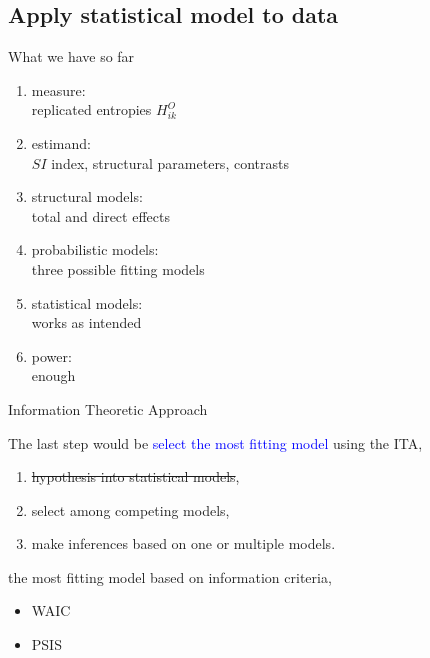 \subsection{Apply statistical model to data}
%
%
\begin{frame}[t, negative]
	\subsectionpage
\end{frame}
%
%
\begin{lhframe}[rhgraphic={\texttt{[image: lab\_to\_research.png]}}]
	{What we have so far}
	
	\begin{enumerate}
		\item measure: \\
		{\small replicated entropies $H^{O}_{ik}$ }
		\item estimand: \\
		{\small $SI$ index, structural parameters, contrasts }
		\item structural models: \\
		{\small total and direct effects }
		\item probabilistic models: \\
		{\small three possible fitting models }
		\item statistical models: \\
		{\small works as intended }
		\item power: \\
		{\small enough }
	\end{enumerate} 
\end{lhframe}
%
%
\begin{lhframe}[rhgraphic={\texttt{[image: ITA\_to\_research.png]}}]
	{Information Theoretic Approach \cite{Anderson_2008, Chamberlain_1965} }
	
	The last step would be \textcolor{blue}{select the most fitting model} using the ITA,
	\begin{enumerate}
		\item \sout{hypothesis into statistical models},
		\item select among competing models, 
		\item make inferences based on one or multiple models.
	\end{enumerate}
	the most fitting model based on information criteria,
	\begin{itemize}
		\item WAIC \cite{Watanabe_2013}
		\item PSIS \cite{Vehtari_et_al_2021}
	\end{itemize}
\end{lhframe}
